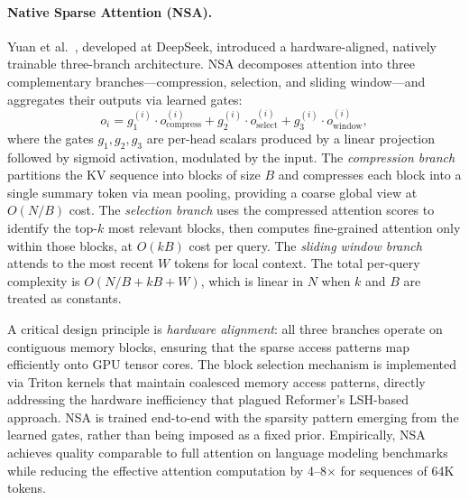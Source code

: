\paragraph{Native Sparse Attention (NSA).}
Yuan et al.~\cite{yuan2025native}, developed at DeepSeek, introduced a hardware-aligned, natively trainable three-branch architecture. NSA decomposes attention into three complementary branches---compression, selection, and sliding window---and aggregates their outputs via learned gates:
\begin{equation}
o_i = g_1^{(i)} \cdot o_{\text{compress}}^{(i)} + g_2^{(i)} \cdot o_{\text{select}}^{(i)} + g_3^{(i)} \cdot o_{\text{window}}^{(i)},
\label{eq:nsa}
\end{equation}
where the gates $g_1, g_2, g_3$ are per-head scalars produced by a linear projection followed by sigmoid activation, modulated by the input. The \emph{compression branch} partitions the KV sequence into blocks of size $B$ and compresses each block into a single summary token via mean pooling, providing a coarse global view at $O(N/B)$ cost. The \emph{selection branch} uses the compressed attention scores to identify the top-$k$ most relevant blocks, then computes fine-grained attention only within those blocks, at $O(kB)$ cost per query. The \emph{sliding window branch} attends to the most recent $W$ tokens for local context. The total per-query complexity is $O(N/B + kB + W)$, which is linear in $N$ when $k$ and $B$ are treated as constants.

A critical design principle is \emph{hardware alignment}: all three branches operate on contiguous memory blocks, ensuring that the sparse access patterns map efficiently onto GPU tensor cores. The block selection mechanism is implemented via Triton kernels that maintain coalesced memory access patterns, directly addressing the hardware inefficiency that plagued Reformer's LSH-based approach. NSA is trained end-to-end with the sparsity pattern emerging from the learned gates, rather than being imposed as a fixed prior. Empirically, NSA achieves quality comparable to full attention on language modeling benchmarks while reducing the effective attention computation by 4--8$\times$ for sequences of 64K tokens.

